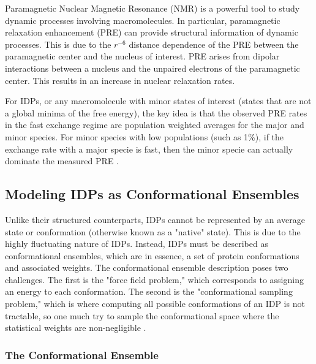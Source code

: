\documentclass{article}
\begin{document}
Paramagnetic Nuclear Magnetic Resonance (NMR) is a powerful tool to study  dynamic processes involving macromolecules. In particular, paramagnetic relaxation enhancement (PRE) can provide structural information of dynamic processes. This is due to the $r^{-6}$ distance dependence of the PRE between the paramagnetic center and the nucleus of interest. PRE arises from dipolar interactions between a nucleus and the unpaired electrons of the paramagnetic center. This results in an increase in nuclear relaxation rates. 

For IDPs, or any macromolecule with minor states of interest (states that are not a global minima of the free energy), the key idea is that the observed PRE rates in the fast exchange regime are population weighted averages for the major and minor species. For minor species with low populations (such as 1\%), if the exchange rate with a major specie is fast, then the minor specie can actually dominate the measured PRE \cite{clore_theory_2009}.

\subsection{}

\subsection{Modeling IDPs as Conformational Ensembles}


Unlike their structured counterparts, IDPs cannot be represented by an average state or conformation (otherwise known as a "native" state). This is due to the highly fluctuating nature of IDPs. Instead, IDPs must be described as conformational ensembles, which are in essence, a set of protein conformations and associated weights. The conformational ensemble description poses two challenges. The first is the "force field problem," which corresponds to assigning an energy to each conformation. The second is the "conformational sampling problem," which is where computing all possible conformations of an IDP is not tractable, so one much try to sample the conformational space where the statistical weights are non-negligible \cite{fu_structure_dynamics_2015}.

\subsubsection{The Conformational Ensemble}
\end{document}
